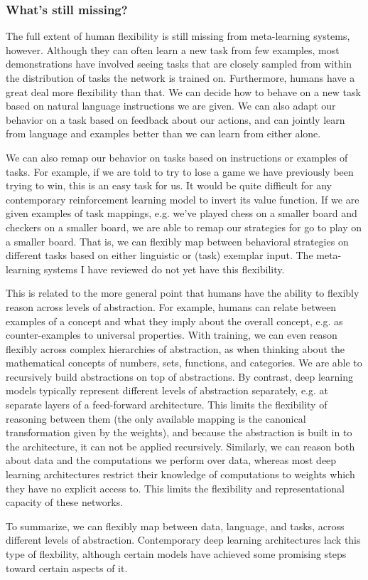 \documentclass[11pt]{article}
\begin{document}
\subsubsection{What's still missing?}

The full extent of human flexibility is still missing from meta-learning systems, however. Although they can often learn a new task from few examples, most demonstrations have involved seeing tasks that are closely sampled from within the distribution of tasks the network is trained on. Furthermore, humans have a great deal more flexibility than that. We can decide how to behave on a new task based on natural language instructions we are given. We can also adapt our behavior on a task based on feedback about our actions, and can jointly learn from language and examples better than we can learn from either alone. \par
We can also remap our behavior on tasks based on instructions or examples of tasks. For example, if we are told to try to lose a game we have previously been trying to win, this is an easy task for us. It would be quite difficult for any contemporary reinforcement learning model to invert its value function. If we are given examples of task mappings, e.g. we've played chess on a smaller board and checkers on a smaller board, we are able to remap our strategies for go to play on a smaller board. That is, we can flexibly map between behavioral strategies on different tasks based on either linguistic or (task) exemplar input. The meta-learning systems I have reviewed do not yet have this flexibility. \par
This is related to the more general point that humans have the ability to flexibly reason across levels of abstraction. For example, humans can relate between examples of a concept and what they imply about the overall concept, e.g. as counter-examples to universal properties. With training, we can even reason flexibly across complex hierarchies of abstraction, as when thinking about the mathematical concepts of numbers, sets, functions, and categories. We are able to recursively build abstractions on top of abstractions. By contrast, deep learning models typically represent different levels of abstraction separately, e.g. at separate layers of a feed-forward architecture. This limits the flexibility of reasoning between them (the only available mapping is the canonical transformation given by the weights), and because the abstraction is built in to the architecture, it can not be applied recursively. Similarly, we can reason both about data and the computations we perform over data, whereas most deep learning architectures restrict their knowledge of computations to weights which they have no explicit access to. This limits the flexibility and representational capacity of these networks. \par 
To summarize, we can flexibly map between data, language, and tasks, across different levels of abstraction. Contemporary deep learning architectures lack this type of flexbility, although certain models have achieved some promising steps toward certain aspects of it. \par 
\end{document}
